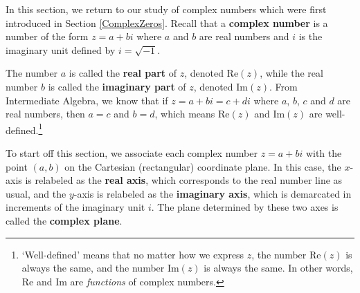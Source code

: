 \documentclass{ximera}
\begin{document}
	\author{Stitz-Zeager}




\setcounter{footnote}{0}

\label{PolarComplex}

In this section, we return to our study of complex numbers which were first introduced in Section \ref{ComplexZeros}.  Recall that a \textbf{complex number} is a number of the form $z = a + bi$ where $a$ and $b$ are real numbers and $i$ is the imaginary unit defined by $i = \sqrt{-1}$. 

 

The number $a$ is called the  \textbf{real part}  of $z$, denoted  $\text{Re}(z)$, while the real number $b$ is called the  \textbf{imaginary part} of $z$, denoted $\text{Im}(z)$.  From Intermediate Algebra, we know that if $z = a + bi = c + di$ where $a$, $b$, $c$ and $d$ are real numbers, then $a = c$ and $b = d$, which means $\text{Re}(z)$ and $\text{Im}(z)$ are well-defined.\footnote{`Well-defined' means that no matter how we express $z$, the number $\text{Re}(z)$ is always the same, and the number $\text{Im}(z)$ is always the same.  In other words, $\text{Re}$ and $\text{Im}$ are \textit{functions} of complex numbers.} 

 

To start off this section, we associate each complex number $z = a+bi$ with the point $(a,b)$ on the Cartesian (rectangular) coordinate plane.  In this case, the $x$-axis is relabeled as the \textbf{real axis}, which corresponds to the real number line as usual,  and the $y$-axis is relabeled as the \textbf{imaginary axis}, which is demarcated in increments of the imaginary unit $i$.  The plane determined by these two axes is called the \textbf{complex plane}.
\end{document}
